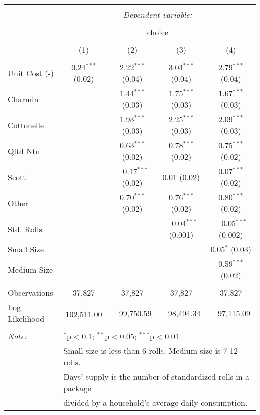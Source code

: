 
\begin{table}[!htbp] \centering 
  \caption{} 
  \label{tab:mnlChicagoBaseline} 
\begin{tabular}{@{\extracolsep{5pt}}lcccc} 
\\[-1.8ex]\hline 
\hline \\[-1.8ex] 
 & \multicolumn{4}{c}{\textit{Dependent variable:}} \\ 
\cline{2-5} 
\\[-1.8ex] & \multicolumn{4}{c}{choice} \\ 
\\[-1.8ex] & (1) & (2) & (3) & (4)\\ 
\hline \\[-1.8ex] 
 Unit Cost (-) & 0.24$^{***}$ (0.02) & 2.22$^{***}$ (0.04) & 3.04$^{***}$ (0.04) & 2.79$^{***}$ (0.04) \\ 
  Charmin &  & 1.44$^{***}$ (0.03) & 1.75$^{***}$ (0.03) & 1.67$^{***}$ (0.03) \\ 
  Cottonelle &  & 1.93$^{***}$ (0.03) & 2.25$^{***}$ (0.03) & 2.09$^{***}$ (0.03) \\ 
  Qltd Ntn &  & 0.63$^{***}$ (0.02) & 0.78$^{***}$ (0.02) & 0.75$^{***}$ (0.02) \\ 
  Scott &  & $-$0.17$^{***}$ (0.02) & 0.01 (0.02) & 0.07$^{***}$ (0.02) \\ 
  Other &  & 0.70$^{***}$ (0.02) & 0.76$^{***}$ (0.02) & 0.80$^{***}$ (0.02) \\ 
  Std. Rolls &  &  & $-$0.04$^{***}$ (0.001) & $-$0.05$^{***}$ (0.002) \\ 
  Small Size &  &  &  & 0.05$^{*}$ (0.03) \\ 
  Medium Size &  &  &  & 0.59$^{***}$ (0.02) \\ 
 \hline \\[-1.8ex] 
Observations & 37,827 & 37,827 & 37,827 & 37,827 \\ 
Log Likelihood & $-$102,511.00 & $-$99,750.59 & $-$98,494.34 & $-$97,115.09 \\ 
\hline 
\hline \\[-1.8ex] 
\textit{Note:}  & \multicolumn{4}{l}{$^{*}$p$<$0.1; $^{**}$p$<$0.05; $^{***}$p$<$0.01} \\ 
 & \multicolumn{4}{l}{Small size is less than 6 rolls. Medium size is 7-12 rolls. } \\ 
 & \multicolumn{4}{l}{Days' supply is the number of standardized rolls in a package} \\ 
 & \multicolumn{4}{l}{divided by a household's average daily consumption.} \\ 
\end{tabular} 
\end{table} 

